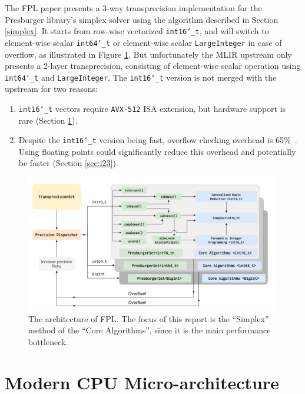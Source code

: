 \documentclass[logo,bsc,singlespacing,parskip]{infthesis}
\newcommand{\dtshort}{\texttt{int16\char`_t}}
\newcommand{\dtlong}{\texttt{int64\char`_t}}
\newenvironment{compactlist}
{ \begin{enumerate}
    \setlength{\itemsep}{0pt}
    \setlength{\parskip}{0pt}
    \setlength{\parsep}{0pt}     
}
{ \end{enumerate} }
\begin{document}
The FPL paper presents a 3-way transprecision implementation for the Presburger
library's simplex solver using the algorithm described in Section \ref{simplex}.
It starts from row-wise vectorized \dtshort{}, and will switch to  element-wise
scalar \dtlong{} or element-wise scalar \texttt{LargeInteger} in case of
overflow, as illustrated in Figure \ref{fig:fpl_arch}. But unfortunately the
MLIR upstream only presents a 2-layer transprecision, consisting of element-wise
scalar operation using \dtlong{} and \texttt{LargeInteger}. The \dtshort{}
version is not merged with the upstream for two reasons: 
\begin{compactlist} 
    \item \dtshort{} vectors require \texttt{AVX-512} ISA extension, but hardware
    support is rare (Section \ref{sec:avx512}). 
    \item Despite the \dtshort{} version being fast, overflow checking overhead
    is 65\%~\cite{FPL2}. Using floating points could significantly reduce this
    overhead and potentially be faster (Section \ref{sec:i23}).  
\end{compactlist}


\begin{figure}
    \begin{center}
    \includegraphics[width=\linewidth]{image/transprecision.png}
    \caption{The architecture of FPL. The focus of this report is the
    ``Simplex'' method of the ``Core Algorithms'', since it is the main
    performance bottleneck.~\cite{FPL2}}
    \label{fig:fpl_arch}
    \end{center}
\end{figure}

\section{Modern CPU Micro-architecture}
\label{sec:avx512}
\end{document}
